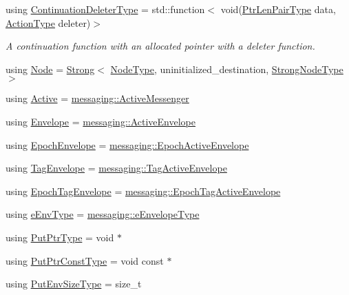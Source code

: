 \begin{DoxyCompactItemize}
using \hyperlink{namespacevt_a6de3bd201e2a040be9362d9d24d1e446}{Continuation\+Deleter\+Type} = std\+::function$<$ void(\hyperlink{namespacevt_a97f320a1d3b9b4035e591671cd7d10f0}{Ptr\+Len\+Pair\+Type} data, \hyperlink{namespacevt_ae0a5a7b18cc99d7b732cb4d44f46b0f3}{Action\+Type} deleter)$>$
\begin{DoxyCompactList}\small\item\em A continuation function with an allocated pointer with a deleter function. \end{DoxyCompactList}\item 
using \hyperlink{namespacevt_a04777c732e1a2b2c317995af9972b999}{Node} = \hyperlink{namespacevt_adbd3338278905742eb2de6db590fd2f1}{Strong}$<$ \hyperlink{namespacevt_a866da9d0efc19c0a1ce79e9e492f47e2}{Node\+Type}, uninitialized\+\_\+destination, \hyperlink{structvt_1_1_strong_node_type}{Strong\+Node\+Type} $>$
\item 
using \hyperlink{namespacevt_ad548cc368cddb926753ac237eb454dae}{Active} = \hyperlink{structvt_1_1messaging_1_1_active_messenger}{messaging\+::\+Active\+Messenger}
\item 
using \hyperlink{namespacevt_aa9c8cc094b5361482021d63012987814}{Envelope} = \hyperlink{structvt_1_1messaging_1_1_active_envelope}{messaging\+::\+Active\+Envelope}
\item 
using \hyperlink{namespacevt_af71a025689a3da5037785b53a7a8e78c}{Epoch\+Envelope} = \hyperlink{structvt_1_1messaging_1_1_epoch_active_envelope}{messaging\+::\+Epoch\+Active\+Envelope}
\item 
using \hyperlink{namespacevt_a7b951ab92dca9319e12e3fc406ccb309}{Tag\+Envelope} = \hyperlink{structvt_1_1messaging_1_1_tag_active_envelope}{messaging\+::\+Tag\+Active\+Envelope}
\item 
using \hyperlink{namespacevt_af23b58014ced6898422213a0e5e6a27a}{Epoch\+Tag\+Envelope} = \hyperlink{structvt_1_1messaging_1_1_epoch_tag_active_envelope}{messaging\+::\+Epoch\+Tag\+Active\+Envelope}
\item 
using \hyperlink{namespacevt_abdfe9ac50e3799705ee21853c1509bf6}{e\+Env\+Type} = \hyperlink{namespacevt_1_1messaging_a6508ef3a4701a2e6fd0bfe3edcc63a6c}{messaging\+::e\+Envelope\+Type}
\item 
using \hyperlink{namespacevt_a537693bfe0223c71eb52bdbd6ea2c741}{Put\+Ptr\+Type} = void $\ast$
\item 
using \hyperlink{namespacevt_a494d6c6dc5cdb9a8d61eaedfa2c4d4f3}{Put\+Ptr\+Const\+Type} = void const  $\ast$
\item 
using \hyperlink{namespacevt_aa241444e21c15238e185923792814fe4}{Put\+Env\+Size\+Type} = size\+\_\+t

\end{DoxyCompactItemize}
